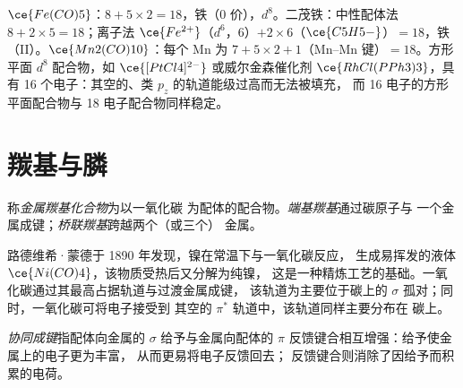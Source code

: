 \begin{example}[计数]\label{ex:b3:organometallic-bonding:count}
$\ce{Fe(CO)5}$：$8 + 5 \times 2 = 18$，铁（0 价），$d^8$。二茂铁：中性配体法 $8 + 2 \times 5 = 18$；离子法
$\ce{Fe^{2+}}$（$d^6$，6）$+ 2 \times 6$（$\ce{C5H5-}$）$= 18$，铁（II）。$\ce{Mn2(CO)10}$：每个 Mn 为 $7 + 5 \times 2 + 1$（Mn–Mn
键）$= 18$。方形平面 $d^8$ 配合物，如 $\ce{[PtCl4]^{2-}}$ 或威尔金森催化剂
$\ce{RhCl(PPh3)3}$，具有 16 个电子：其空的、类 $p_z$ 的轨道能级过高而无法被填充，
而 16 电子的方形平面配合物与 18 电子配合物同样稳定。
\end{example}

\section{羰基与膦}

\begin{definition}[金属羰基化合物]\label{def:b3:organometallic-bonding:carbonyl}
称\emph{金属羰基化合物}为以一氧化碳
为配体的配合物。\emph{端基羰基}通过碳原子与
一个金属成键；\emph{桥联羰基}跨越两个（或三个）
金属。
\end{definition}

路德维希·蒙德于 1890 年发现，镍在常温下与一氧化碳反应，
生成易挥发的液体 $\ce{Ni(CO)4}$，该物质受热后又分解为纯镍，
这是一种精炼工艺的基础。一氧化碳通过其最高占据轨道与过渡金属成键，
该轨道为主要位于碳上的 $\sigma$ 孤对；同时，一氧化碳可将电子接受到
其空的 $\pi^*$ 轨道中，该轨道同样主要分布在
碳上。

\begin{definition}[协同成键]\label{def:b3:organometallic-bonding:synergic}
\emph{协同成键}指配体向金属的 $\sigma$ 给予与金属向配体的
$\pi$ 反馈键合相互增强：给予使金属上的电子更为丰富，
从而更易将电子反馈回去；
反馈键合则消除了因给予而积累的电荷。
\end{definition}

